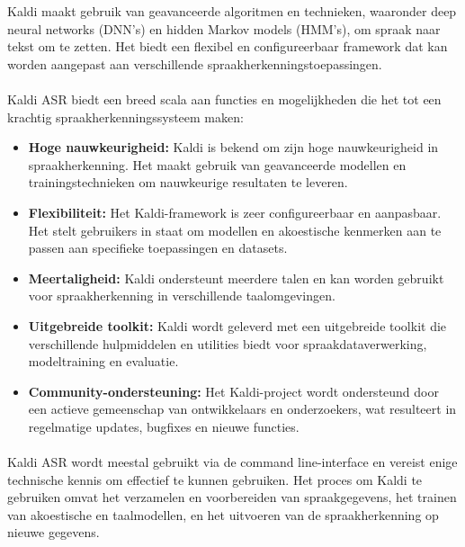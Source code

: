 Kaldi maakt gebruik van geavanceerde algoritmen en technieken, waaronder deep neural networks (DNN's) en hidden Markov models (HMM's), om spraak naar tekst om te zetten. Het biedt een flexibel en configureerbaar framework dat kan worden aangepast aan verschillende spraakherkenningstoepassingen.

\paragraph{}
Kaldi ASR biedt een breed scala aan functies en mogelijkheden die het tot een krachtig spraakherkenningssysteem maken:

\begin{itemize}
    \item \textbf{Hoge nauwkeurigheid:} Kaldi is bekend om zijn hoge nauwkeurigheid in spraakherkenning. Het maakt gebruik van geavanceerde modellen en trainingstechnieken om nauwkeurige resultaten te leveren.

    \item \textbf{Flexibiliteit:} Het Kaldi-framework is zeer configureerbaar en aanpasbaar. Het stelt gebruikers in staat om modellen en akoestische kenmerken aan te passen aan specifieke toepassingen en datasets.

    \item \textbf{Meertaligheid:} Kaldi ondersteunt meerdere talen en kan worden gebruikt voor spraakherkenning in verschillende taalomgevingen.

    \item \textbf{Uitgebreide toolkit:} Kaldi wordt geleverd met een uitgebreide toolkit die verschillende hulpmiddelen en utilities biedt voor spraakdataverwerking, modeltraining en evaluatie.

    \item \textbf{Community-ondersteuning:} Het Kaldi-project wordt ondersteund door een actieve gemeenschap van ontwikkelaars en onderzoekers, wat resulteert in regelmatige updates, bugfixes en nieuwe functies.
\end{itemize}

\paragraph{}
Kaldi ASR wordt meestal gebruikt via de command line-interface en vereist enige technische kennis om effectief te kunnen gebruiken. Het proces om Kaldi te gebruiken omvat het verzamelen en voorbereiden van spraakgegevens, het trainen van akoestische en taalmodellen, en het uitvoeren van de spraakherkenning op nieuwe gegevens.

